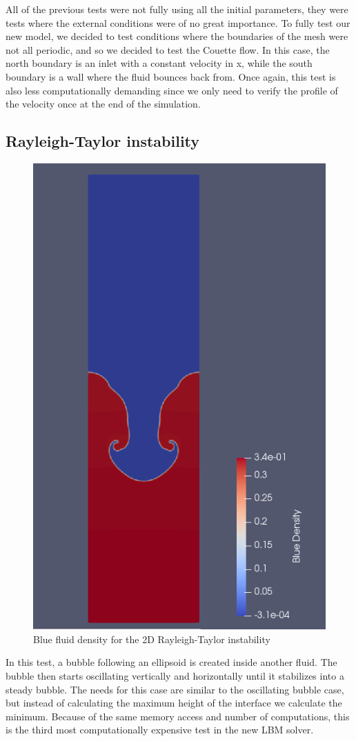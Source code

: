 \documentclass[12pt]{book}
\begin{document}
All of the previous tests were not fully using all the initial parameters, they were tests where the external conditions were of no great importance. To fully test our new model, we decided to test conditions where the boundaries of the mesh were not all periodic, and so we decided to test the Couette flow. In this case, the north boundary is an inlet with a constant velocity in x, while the south boundary is a wall where the fluid bounces back from. Once again, this test is also less computationally demanding since we only need to verify the profile of the velocity once at the end of the simulation. 

\subsection{Rayleigh-Taylor instability}
\begin{figure}[H]
	\centering
	\includegraphics[width=0.5\linewidth]{Resources/Images/rt.png}
	\caption{Blue fluid density for the 2D Rayleigh-Taylor instability}
	\label{fig:rt}
\end{figure}
In this test, a bubble following an ellipsoid is created inside another fluid. The bubble then starts oscillating vertically and horizontally until it stabilizes into a steady bubble. The needs for this case are similar to the oscillating bubble case, but instead of calculating the maximum height of the interface we calculate the minimum. Because of the same memory access and number of computations, this is the third most computationally expensive test in the new LBM solver.
\end{document}

